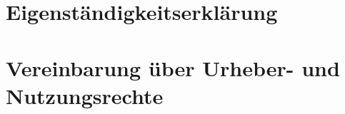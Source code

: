 \section{Eigenständigkeitserklärung}
\newpage

\section{Vereinbarung über Urheber- und \\ Nutzungsrechte}
